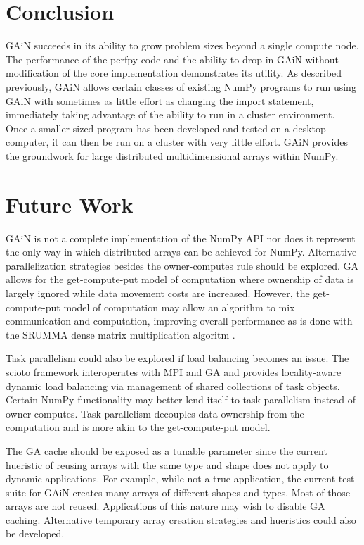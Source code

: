 \documentclass[preprint]{sigplanconf}
\begin{document}
\section{Conclusion}

GAiN succeeds in its ability to grow problem sizes beyond a single compute
node. The performance of the perfpy code and the ability to drop-in GAiN
without modification of the core implementation demonstrates its utility. As
described previously, GAiN allows certain classes of existing NumPy programs
to run using GAiN with sometimes as little effort as changing the import
statement, immediately taking advantage of the ability to run in a cluster
environment. Once a smaller-sized program has been developed and tested on a
desktop computer, it can then be run on a cluster with very little effort.
GAiN provides the groundwork for large distributed multidimensional arrays
within NumPy.

\section{Future Work}

GAiN is not a complete implementation of the NumPy API nor does it represent
the only way in which distributed arrays can be achieved for NumPy.
Alternative parallelization strategies besides the owner-computes rule should
be explored. GA allows for the get-compute-put model of computation where
ownership of data is largely ignored while data movement costs are increased.
However, the get-compute-put model of computation may allow an algorithm to
mix communication and computation, improving overall performance as is done
with the SRUMMA dense matrix multiplication algoritm \cite{Kri04}.

Task parallelism could also be explored if load balancing becomes an issue.
The scioto framework \cite{Din08} interoperates with MPI and GA and provides
locality-aware dynamic load balancing via management of shared collections of
task objects. Certain NumPy functionality may better lend itself to task
parallelism instead of owner-computes. Task parallelism decouples data
ownership from the computation and is more akin to the get-compute-put model.

The GA cache should be exposed as a tunable parameter since the current
hueristic of reusing arrays with the same type and shape does not apply to
dynamic applications. For example, while not a true application, the current
test suite for GAiN creates many arrays of different shapes and types. Most of
those arrays are not reused. Applications of this nature may wish to disable
GA caching.  Alternative temporary array creation strategies and hueristics
could also be developed.
\end{document}
